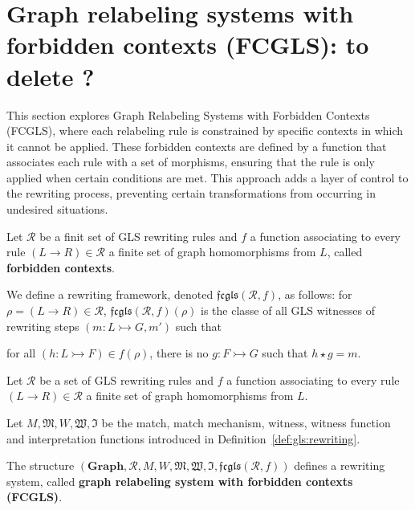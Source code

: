
    \section{Graph relabeling systems with forbidden contexts (FCGLS): to delete ?}
      This section explores Graph Relabeling Systems with Forbidden Contexts (FCGLS), where each relabeling rule is constrained by specific contexts in which it cannot be applied. These forbidden contexts are defined by a function that associates each rule with a set of morphisms, ensuring that the rule is only applied when certain conditions are met. This approach adds a layer of control to the rewriting process, preventing certain transformations from occurring in undesired situations.
     
      \cite{litovsky1999graph}
      
      \begin{definition}
        Let $\mathcal{R}$ be a finit set of GLS rewriting rules and $f$ a function associating to every rule $(L \rightarrow R) \in \mathcal{R}$ a finite set of graph homomorphisms from $L$, called \textbf{forbidden contexts}.
      
        We define a rewriting framework, denoted $\mathfrak{fcgls}(\mathcal{R},f)$, as follows: for $\rho = (L \rightarrow R) \in \mathcal{R}$, $\mathfrak{fcgls}(\mathcal{R},f)(\rho)$ is the classe of all GLS witnesses of rewriting steps
        $\left(  m: L \rightarrowtail G, m'  \right)$ such that 
      
        for all $(h : L \rightarrowtail F) \in f(\rho)$, there is no $g:F \rightarrowtail G$ such that $h \star g = m$.
      \end{definition}

      
      \begin{definition}
        Let $\mathcal{R}$ be a set of GLS rewriting rules and $f$ a function associating to every rule $(L \rightarrow R) \in \mathcal{R}$ a finite set of graph homomorphisms from $L$.

        Let $M, \mathfrak{M}, W , \mathfrak{W}, \mathfrak{I}$ be the match, match mechanism, witness, witness function and interpretation functions introduced in Definition~\ref{def:gls:rewriting}.
      
        The structure $(\mathbf{Graph},\mathcal{R},M,W,\mathfrak{M},\mathfrak{W},\mathfrak{I}, \mathfrak{fcgls}(\mathcal{R},f))$ defines a rewriting system, called \textbf{graph relabeling system with forbidden contexts (FCGLS)}. 
      \end{definition} 
      
